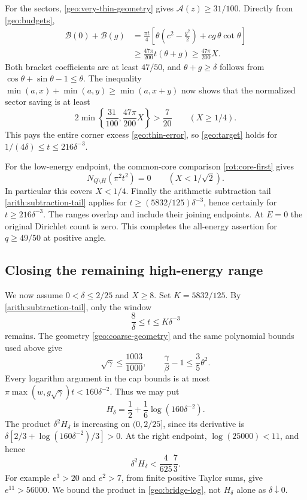 \documentclass[11pt,reqno]{amsart}
\numberwithin{equation}{section}
\begin{document}
For the sectors, \eqref{geo:very-thin-geometry} gives
$\mathcal A(z)\ge31/100$.  Directly from \eqref{geo:budgets},
\begin{align*}
 \mathcal B(0)+\mathcal B(g)
  &=\frac{\pi t}{4}
       \left[\theta\left(c^2-\frac{g^2}{2}\right)
                                      +cg\,\theta\cot\theta\right]\\
  &\ge\frac{47\pi}{200}t(\theta+g)
   \ge\frac{47\pi}{200}X.
\end{align*}
Both bracket coefficients are at least $47/50$, and
$\theta+g\ge\delta$ follows from
$\cos\theta+\sin\theta-1\le\theta$.  The inequality
$\min(a,x)+\min(a,y)\ge\min(a,x+y)$ now shows that the normalized
sector saving is at least
\[
 2\min\left\{\frac{31}{100},\frac{47\pi}{200}X\right\}
                         >\frac7{20}\qquad(X\ge1/4).
\]
This pays the entire corner excess \eqref{geo:thin-error}, so
\eqref{geo:target} holds for
$1/(4\delta)\le t\le216\delta^{-3}$.

For the low-energy endpoint, the common-core comparison
\eqref{rot:core-first} gives
\begin{equation}\label{geo:core-zero}
 N_{Q\setminus H}(\pi^2t^2)=0\qquad(X<1/\sqrt2).
\end{equation}
In particular this covers $X<1/4$.  Finally the arithmetic subtraction
tail \eqref{arith:subtraction-tail} applies for
$t\ge(5832/125)\delta^{-3}$, hence certainly for
$t\ge216\delta^{-3}$.  The ranges overlap and include their joining
endpoints.  At $E=0$ the original Dirichlet count is zero.  This completes
the all-energy assertion for $q\ge49/50$ at positive angle.

\subsection{Closing the remaining high-energy range}
\label{geo:high-energy-bridge}

We now assume $0<\delta\le2/25$ and $X\ge8$.  Set
$K=5832/125$.  By \eqref{arith:subtraction-tail}, only the window
\begin{equation}\label{geo:bridge-window}
 \frac8\delta\le t\le K\delta^{-3}
\end{equation}
remains.  The geometry \eqref{geo:coarse-geometry} and the same polynomial
bounds used above give
\[
 \sqrt\gamma\le\frac{1003}{1000},\qquad
 \frac\gamma\beta-1\le\frac35\theta^2.
\]
Every logarithm argument in the cap bounds is at most
$\pi\max(w,g\sqrt\gamma)t<160\delta^{-2}$.  Thus we may put
\[
 H_\delta=\frac12+\frac16\log(160\delta^{-2}).
\]
The product $\delta^2H_\delta$ is increasing on $(0,2/25]$, since its
derivative is
$\delta[2/3+\log(160\delta^{-2})/3]>0$.
At the right endpoint, $\log(25000)<11$, and hence
\begin{equation}\label{geo:bridge-log}
 \delta^2H_\delta<\frac4{625}\frac73.
\end{equation}
For example $e^3>20$ and $e^2>7$, from finite positive Taylor sums,
give $e^{11}>56000$.  We bound the product in
\eqref{geo:bridge-log}, not $H_\delta$ alone as $\delta\downarrow0$.
\end{document}
